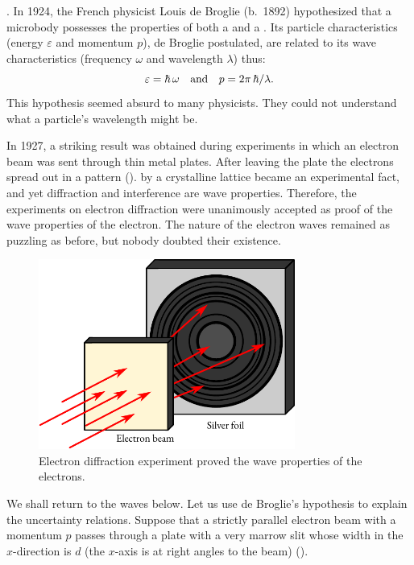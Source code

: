 . In
1924, the French physicist Louis de Broglie (b.~1892) hypothesized that
a microbody possesses the properties of both a  and a . Its particle characteristics (energy $\varepsilon$ and momentum $p$), de Broglie postulated, are related to its wave characteristics (frequency $\omega$ and wavelength $\lambda$) thus:
\begin{equation}%
\varepsilon = \hbar \, \omega \qand p = 2 \pi \, \hbar / \lambda.
\label{eq-5.4}
\end{equation}
This hypothesis seemed absurd to many physicists. They could not
understand what a particle's wavelength might be.

In 1927, a striking result was obtained during experiments in which
an electron beam was sent through thin metal plates. After leaving the
plate the electrons spread out in a  pattern ().  by a crystalline lattice became an experimental fact, and yet diffraction and interference are wave properties. Therefore, the experiments on electron diffraction were unanimously accepted as proof of the wave properties of the electron. The nature of the electron waves remained as puzzling as before, but nobody doubted their existence.

\begin{figure}[!ht]
\centering
\includegraphics[width=0.75\textwidth]{figures/diffraction-01.pdf}
\caption{ Electron diffraction experiment proved the wave properties of the electrons.\label{diffraction1}}
\end{figure}

We shall return to the waves below. Let us use de Broglie's hypothesis
to explain the uncertainty relations. Suppose that a strictly parallel
electron beam with a momentum $p$ passes through a plate with a very
marrow slit whose width in the $x$-direction is $d$ (the $x$-axis is at right
angles to the beam) (). 

